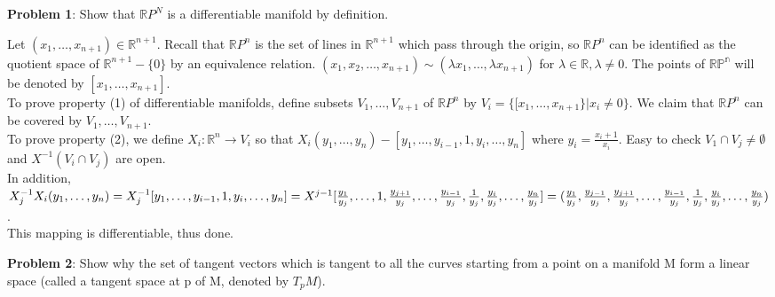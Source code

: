 \documentclass[12pt,letterpaper,cm]{hmcpset}
\begin{document}
\textbf{Problem 1}: Show that $\mathbb{R}P^N$ is a differentiable manifold by definition. 

\begin{solution}
Let $(x_1, \ldots, x_{n+1}) \in \mathbb{R}^{n+1}$. Recall that $\mathbb{R}P^n$ is the set of lines in $\mathbb{R}^{n+1}$ which pass through the origin, so $\mathbb{R}P^n$ can be identified as the quotient space of $\mathbb{R}^{n+1} - \{0\}$ by an equivalence relation. $(x_1, x_2, \ldots, x_{n+1}) \sim (\lambda x_1, \ldots, \lambda x_{n+1})$ for $\lambda \in \mathbb{R}, \lambda \neq 0$. The points of $\mathbb{RP^n}$ will be denoted by $[x_1, \ldots, x_{n+1}]$. \\

To prove property (1) of differentiable manifolds, define subsets $V_1, \ldots, V_{n+1}$ of $\mathbb{R}P^n$ by $V_i = \{[x_1, \ldots, x_{n+1}\} | x_i \neq 0 \}$. We claim that $\mathbb{R}P^n$ can be covered by $V_1, \ldots, V_{n+1}$. \\

To prove property (2), we define $X_i: \mathbb{R}^n \to V_i$ so that $X_i (y_1, \ldots, y_n) - [y_1, \ldots, y_{i-1}, 1, y_i, \ldots, y_n]$ where $y_i = \frac{x_i + 1}{x_i}$. Easy to check $V_1 \cap V_j \neq \emptyset$ and $X^{-1} (V_i \cap V_j)$ are open. \\
In addition, $X_j^{-1}X_i (y_1, \ldots, y_n) = X_j^{-1} [y_1, \ldots, y_{i-1}, 1, y_i, \ldots, y_n] \\
= X^{j-1}[\frac{y_1}{y_j}, \ldots, 1, \frac{y_{j+1}}{y_{j}}, \ldots, \frac{y_{i-1}}{y_j}, \frac{1}{y_j}, \frac{y_i}{y_j}, \ldots, \frac{y_n}{y_j}] = (\frac{y_1}{y_j}, \frac{y_{j-1}}{y_j}, \frac{y_{j+1}}{y_{j}}, \ldots, \frac{y_{i-1}}{y_j}, \frac{1}{y_j}, \frac{y_i}{y_j}, \ldots, \frac{y_n}{y_j})$. \\
This mapping is differentiable, thus done. 

\end{solution}

\textbf{Problem 2}: Show why the set of tangent vectors which is tangent to all the curves starting from a point on a manifold M form a linear space (called a tangent space at p of M, denoted by $T_pM$).
\end{document}
